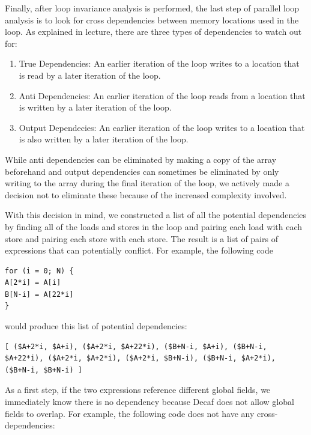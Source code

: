 \documentclass[11pt]{article}
\begin{document}
Finally, after loop invariance analysis is performed, the last step of
parallel loop analysis is to look for cross dependencies between
memory locations used in the loop. As explained in lecture, there are three
types of dependencies to watch out for: 

\begin{enumerate} 

\item True Dependencies: An earlier iteration of the loop writes
  to a location that is read by a later iteration of the loop. 

\item Anti Dependencies: An earlier iteration of the loop reads from a
  location  that is written by a later iteration of the loop. 

\item Output Dependecies: An earlier iteration of the loop writes to a
  location that is also written by a later iteration of the loop. 

\end{enumerate} 

While anti dependencies can be eliminated by making a copy of the
array beforehand and output dependencies can sometimes be eliminated
by only writing to the array during the final iteration of the loop,
we actively made a decision not to eliminate these because of the increased
complexity involved. 

With this decision in mind, we constructed a list of all the potential
dependencies by finding all of the loads and stores in the loop and
pairing each load with each store and pairing each store with each
store. The result is a list of pairs of expressions that can
potentially conflict. For example, the following code 
\begin{verbatim}
for (i = 0; N) { 
A[2*i] = A[i]
B[N-i] = A[22*i]
}
\end{verbatim}
would produce this list of potential dependencies: 
\begin{verbatim}
[ ($A+2*i, $A+i), ($A+2*i, $A+22*i), ($B+N-i, $A+i), ($B+N-i,
$A+22*i), ($A+2*i, $A+2*i), ($A+2*i, $B+N-i), ($B+N-i, $A+2*i),
($B+N-i, $B+N-i) ]
\end{verbatim}


As a first step, if the two expressions
reference different global fields, we immediately know there is no
dependency because Decaf does not allow global fields to overlap. For
example, the following code does not have any cross-dependencies: 
\end{document}
